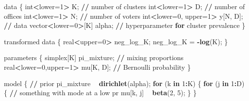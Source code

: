 \documentclass[12pt,letterpaper]{article}
\numberwithin{equation}{section}
\newenvironment{Shaded}{\begin{snugshade}}{\end{snugshade}}
\newcommand{\ControlFlowTok}[1]{\textcolor[rgb]{0.13,0.29,0.53}{\textbf{#1}}}
\newcommand{\DecValTok}[1]{\textcolor[rgb]{0.00,0.00,0.81}{#1}}
\newcommand{\ErrorTok}[1]{\textcolor[rgb]{0.64,0.00,0.00}{\textbf{#1}}}
\newcommand{\KeywordTok}[1]{\textcolor[rgb]{0.13,0.29,0.53}{\textbf{#1}}}
\newcommand{\NormalTok}[1]{#1}
\newcommand{\OperatorTok}[1]{\textcolor[rgb]{0.81,0.36,0.00}{\textbf{#1}}}
\newcommand{\StringTok}[1]{\textcolor[rgb]{0.31,0.60,0.02}{#1}}
\begin{document}
\begin{Shaded}
\begin{Highlighting}[]
\NormalTok{data \{}
\NormalTok{  int}\OperatorTok{<}\NormalTok{lower=}\DecValTok{1}\OperatorTok{>}\StringTok{ }\NormalTok{K;                }\OperatorTok{/}\ErrorTok{/}\StringTok{ }\NormalTok{number of clusters}
\NormalTok{  int}\OperatorTok{<}\NormalTok{lower=}\DecValTok{1}\OperatorTok{>}\StringTok{ }\NormalTok{D;                }\OperatorTok{/}\ErrorTok{/}\StringTok{ }\NormalTok{number of offices}
\NormalTok{  int}\OperatorTok{<}\NormalTok{lower=}\DecValTok{1}\OperatorTok{>}\StringTok{ }\NormalTok{N;                }\OperatorTok{/}\ErrorTok{/}\StringTok{ }\NormalTok{number of voters}
\NormalTok{  int}\OperatorTok{<}\NormalTok{lower=}\DecValTok{0}\NormalTok{, upper=}\DecValTok{1}\OperatorTok{>}\StringTok{ }\NormalTok{y[N, D]; }\OperatorTok{/}\ErrorTok{/}\StringTok{ }\NormalTok{data}
\NormalTok{  vector}\OperatorTok{<}\NormalTok{lower=}\DecValTok{0}\OperatorTok{>}\NormalTok{[K] alpha;      }\OperatorTok{/}\ErrorTok{/}\StringTok{ }\NormalTok{hyperparameter }\ControlFlowTok{for}\NormalTok{ cluster prevalence}
\NormalTok{\}}

\NormalTok{transformed data \{}
\NormalTok{  real}\OperatorTok{<}\NormalTok{upper=}\DecValTok{0}\OperatorTok{>}\StringTok{ }\NormalTok{neg_log_K;}
\NormalTok{  neg_log_K =}\StringTok{ }\OperatorTok{-}\KeywordTok{log}\NormalTok{(K);}
\NormalTok{\}}


\NormalTok{parameters \{}
\NormalTok{  simplex[K] pi_mixture;          }\OperatorTok{/}\ErrorTok{/}\StringTok{ }\NormalTok{mixing proportions}
\NormalTok{  real}\OperatorTok{<}\NormalTok{lower=}\DecValTok{0}\NormalTok{,upper=}\DecValTok{1}\OperatorTok{>}\StringTok{ }\NormalTok{mu[K, D]; }\OperatorTok{/}\ErrorTok{/}\StringTok{ }\NormalTok{Bernoulli probability}
\NormalTok{\}}

\NormalTok{model \{}
  \OperatorTok{/}\ErrorTok{/}\StringTok{ }\NormalTok{prior}
\NormalTok{  pi_mixture }\OperatorTok{~}\StringTok{ }\KeywordTok{dirichlet}\NormalTok{(alpha);}
  \ControlFlowTok{for}\NormalTok{ (k }\ControlFlowTok{in} \DecValTok{1}\OperatorTok{:}\NormalTok{K) \{}
    \ControlFlowTok{for}\NormalTok{ (j }\ControlFlowTok{in} \DecValTok{1}\OperatorTok{:}\NormalTok{D) \{}
      \OperatorTok{/}\ErrorTok{/}\StringTok{ }\NormalTok{something with mode at a low pr}
\NormalTok{      mu[k, j] }\OperatorTok{~}\StringTok{ }\KeywordTok{beta}\NormalTok{(}\DecValTok{2}\NormalTok{, }\DecValTok{5}\NormalTok{);}
\NormalTok{    \}}
\NormalTok{  \}}


\end{Highlighting}
\end{Shaded}
\end{document}
